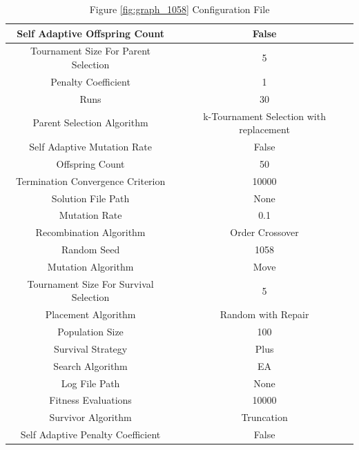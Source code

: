 \documentclass{standalone}
\begin{document}
\begin{table}[!htb]
	\centering
	\caption{Figure \ref{fig:graph_1058} Configuration File}
	\label{tab:graph_1058}
	\begin{tabular}{| c | c |}
		\hline
		Self Adaptive Offspring Count		& False		 \\
		\hline
		Tournament Size For Parent Selection		& 5		 \\
		\hline
		Penalty Coefficient		& 1		 \\
		\hline
		Runs		& 30		 \\
		\hline
		Parent Selection Algorithm		& k-Tournament Selection with replacement		 \\
		\hline
		Self Adaptive Mutation Rate		& False		 \\
		\hline
		Offspring Count		& 50		 \\
		\hline
		Termination Convergence Criterion		& 10000		 \\
		\hline
		Solution File Path		& None		 \\
		\hline
		Mutation Rate		& 0.1		 \\
		\hline
		Recombination Algorithm		& Order Crossover		 \\
		\hline
		Random Seed		& 1058		 \\
		\hline
		Mutation Algorithm		& Move		 \\
		\hline
		Tournament Size For Survival Selection		& 5		 \\
		\hline
		Placement Algorithm		& Random with Repair		 \\
		\hline
		Population Size		& 100		 \\
		\hline
		Survival Strategy		& Plus		 \\
		\hline
		Search Algorithm		& EA		 \\
		\hline
		Log File Path		& None		 \\
		\hline
		Fitness Evaluations		& 10000		 \\
		\hline
		Survivor Algorithm		& Truncation		 \\
		\hline
		Self Adaptive Penalty Coefficient		& False		 \\
		\hline
	\end{tabular}
\end{table}
\end{document}
